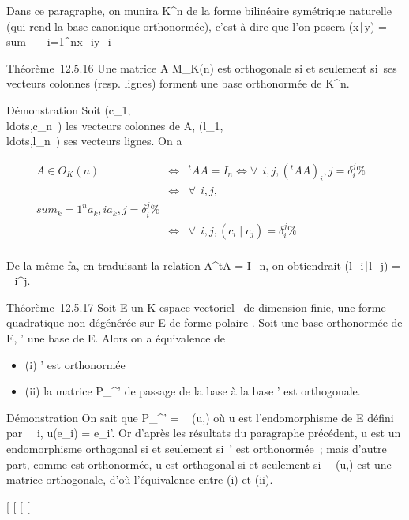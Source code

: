 \documentclass[]{article}
\begin{document}
Dans ce paragraphe, on munira K^n de la forme bilinéaire
symétrique naturelle (qui rend la base canonique orthonormée),
c'est-à-dire que l'on posera (x∣y)
= \\sum ~
_i=1^nx_iy_i

Théorème~12.5.16 Une matrice A \in M_K(n) est orthogonale si et
seulement si~ses vecteurs colonnes (resp. lignes) forment une base
orthonormée de K^n.

Démonstration Soit
(c_1,\\ldots,c_n~)
les vecteurs colonnes de A,
(l_1,\\ldots,l_n~)
ses vecteurs lignes. On a

\begin{align*} A \in O_K(n)&
\Leftrightarrow & ^tAA = I_ n
\Leftrightarrow \forall~~i,j,
(^tAA)_ i,j = \delta_i^j\%&
\\ & \Leftrightarrow &
\forall~~i,j, \\sum
_k=1^na_ k,ia_k,j =
\delta_i^j \%& \\ &
\Leftrightarrow & \forall~~i,j,
(c_i∣c_j) =
\delta_i^j \%& \\
\end{align*}

De la même fa\ccon, en traduisant la relation
A^tA = I_n, on obtiendrait
(l_i∣l_j) =
\delta_i^j.

Théorème~12.5.17 Soit E un K-espace vectoriel ~de dimension finie, \Phi une
forme quadratique non dégénérée sur E de forme polaire \phi. Soit  une
base orthonormée de E, ' une base de E. Alors on a équivalence de

\begin{itemize}
\itemsep1pt\parskip0pt
\item
  (i) ' est orthonormée
\item
  (ii) la matrice P_^' de passage de la base  à la
  base ' est orthogonale.
\end{itemize}

Démonstration On sait que P_^'
= \mathrmMat~ (u,) où u est
l'endomorphisme de E défini par \forall~~i,
u(e_i) = e_i'. Or d'après les résultats du paragraphe
précédent, u est un endomorphisme orthogonal si et seulement si~' est
orthonormée~; mais d'autre part, comme  est orthonormée, u est
orthogonal si et seulement
si~\mathrmMat~ (u,) est une
matrice orthogonale, d'où l'équivalence entre (i) et (ii).

[
[
[
[
\end{document}
